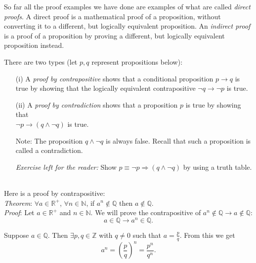 \documentclass[12pt]{amsart}
\theoremstyle{definition}
\theoremstyle{remark}
\newcommand{\nats}{\mathbb N}
\newcommand{\ints}{\mathbb Z}
\newcommand{\rats}{\mathbb Q}
\newcommand{\reals}{\mathbb R}
\begin{document}
\newpage

So far all the proof examples we have done are examples of what are called \emph{direct proofs}.  A direct proof is a mathematical proof of a proposition, without converting it to a different, but logically equivalent proposition.  An \emph{indirect proof} is a proof of a proposition by proving a different, but logically equivalent proposition instead.

\bigskip

There are two types (let $p,q$ represent propositions below):

\begin{enumerate}

\item[(i)] A \emph{proof by contrapositive} shows that a conditional proposition $p\rightarrow q$ is true by showing that the logically equivalent contrapositive $\lnot q\rightarrow \lnot p$ is true.

\bigskip

\item[(ii)]  A \emph{proof by contradiction} shows that a proposition $p$ is true by showing that\\ $\lnot p\rightarrow (q\wedge \lnot q)$ is true.

\medskip

Note:  The proposition $q\wedge \lnot q$ is always false.  Recall that such a proposition is called a contradiction. 

\bigskip

\emph{Exercise left for the reader:}  Show $p\equiv \lnot p\Rightarrow (q\wedge \lnot q)$ by using a truth table.\\ \\

\end{enumerate}

Here is a proof by contrapositive:\\


\emph{Theorem}:  $\forall a\in\reals^{+}$, $\forall n\in\nats$, if $a^{n}\not\in \rats$ then $a\not\in\rats$.\\


\emph{Proof}:  Let $a\in\reals^{+}$ and $n\in\nats$.  We will prove the contrapositive of $a^{n}\not\in \rats\rightarrow a\not\in\rats$:  $$a\in\rats\rightarrow a^{n}\in\rats.$$

\medskip

Suppose $a\in\rats$.  Then $\exists p,q\in\ints$ with $q\neq 0$ such that $\displaystyle a=\frac{p}{q}$.  From this we get $$a^{n}=\left(\frac{p}{q}\right)^{n}=\frac{p^{n}}{q^{n}}.$$
\end{document}
